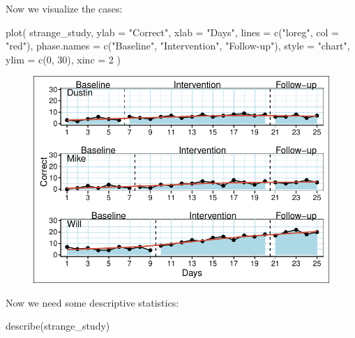 \documentclass[
  letterpaper,
  DIV=11,
  numbers=noendperiod]{scrreprt}
\newenvironment{Shaded}{\begin{snugshade}}{\end{snugshade}}
\newcommand{\AttributeTok}[1]{\textcolor[rgb]{0.40,0.45,0.13}{#1}}
\newcommand{\DecValTok}[1]{\textcolor[rgb]{0.68,0.00,0.00}{#1}}
\newcommand{\FunctionTok}[1]{\textcolor[rgb]{0.28,0.35,0.67}{#1}}
\newcommand{\NormalTok}[1]{\textcolor[rgb]{0.00,0.23,0.31}{#1}}
\newcommand{\StringTok}[1]{\textcolor[rgb]{0.13,0.47,0.30}{#1}}
\begin{document}
Now we visualize the cases:

\begin{Shaded}
\begin{Highlighting}[]
\FunctionTok{plot}\NormalTok{(}
\NormalTok{  strange\_study,}
  \AttributeTok{ylab =} \StringTok{"Correct"}\NormalTok{,}
  \AttributeTok{xlab =} \StringTok{"Days"}\NormalTok{,}
  \AttributeTok{lines =} \FunctionTok{c}\NormalTok{(}\StringTok{"loreg"}\NormalTok{, }\AttributeTok{col =} \StringTok{"red"}\NormalTok{),}
  \AttributeTok{phase.names =} \FunctionTok{c}\NormalTok{(}\StringTok{"Baseline"}\NormalTok{, }\StringTok{"Intervention"}\NormalTok{, }\StringTok{"Follow{-}up"}\NormalTok{),}
  \AttributeTok{style =} \StringTok{"chart"}\NormalTok{,}
  \AttributeTok{ylim =} \FunctionTok{c}\NormalTok{(}\DecValTok{0}\NormalTok{, }\DecValTok{30}\NormalTok{),}
  \AttributeTok{xinc =} \DecValTok{2}
\NormalTok{)}
\end{Highlighting}
\end{Shaded}

\begin{figure}[H]

{\centering \includegraphics{./ch_introduction_files/figure-pdf/plot-strange-study-1.pdf}

}

\end{figure}

Now we need some descriptive statistics:

\begin{Shaded}
\begin{Highlighting}[]
\FunctionTok{describe}\NormalTok{(strange\_study)}
\end{Highlighting}
\end{Shaded}
\end{document}
